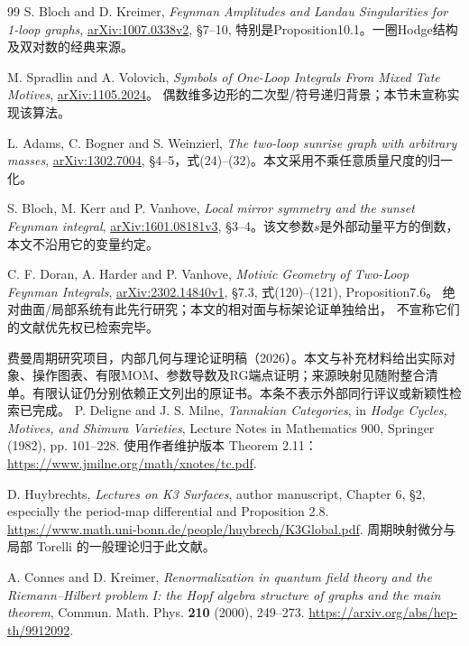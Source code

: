 \documentclass[11pt,a4paper,oneside]{ctexart}
\theoremstyle{cnplain}
\theoremstyle{definition}
\theoremstyle{remark}
\numberwithin{equation}{section}
\begin{document}
\begin{thebibliography}{99}
S. Bloch and D. Kreimer,
\emph{Feynman Amplitudes and Landau Singularities for 1-loop graphs},
\href{https://arxiv.org/abs/1007.0338}{arXiv:1007.0338v2},
\S7--10, 特别是Proposition10.1。一圈Hodge结构及双对数的经典来源。

M. Spradlin and A. Volovich,
\emph{Symbols of One-Loop Integrals From Mixed Tate Motives},
\href{https://arxiv.org/abs/1105.2024}{arXiv:1105.2024}。
偶数维多边形的二次型/符号递归背景；本节未宣称实现该算法。

L. Adams, C. Bogner and S. Weinzierl,
\emph{The two-loop sunrise graph with arbitrary masses},
\href{https://arxiv.org/abs/1302.7004}{arXiv:1302.7004},
\S4--5，式(24)--(32)。本文采用不乘任意质量尺度的归一化。

S. Bloch, M. Kerr and P. Vanhove,
\emph{Local mirror symmetry and the sunset Feynman integral},
\href{https://arxiv.org/abs/1601.08181}{arXiv:1601.08181v3},
\S3--4。该文参数$s$是外部动量平方的倒数，本文不沿用它的变量约定。

C. F. Doran, A. Harder and P. Vanhove,
\emph{Motivic Geometry of Two-Loop Feynman Integrals},
\href{https://arxiv.org/abs/2302.14840}{arXiv:2302.14840v1},
\S7.3, 式(120)--(121), Proposition7.6。
绝对曲面/局部系统有此先行研究；本文的相对面与标架论证单独给出，
不宣称它们的文献优先权已检索完毕。

 费曼周期研究项目，内部几何与理论证明稿（2026）。本文与补充材料给出实际对象、操作图表、有限MOM、参数导数及RG端点证明；来源映射见随附整合清单。有限认证仍分别依赖正文列出的原证书。本条不表示外部同行评议或新颖性检索已完成。
P. Deligne and J. S. Milne,
\emph{Tannakian Categories}, in \emph{Hodge Cycles, Motives, and Shimura Varieties},
Lecture Notes in Mathematics 900, Springer (1982), pp. 101--228.
使用作者维护版本 Theorem 2.11：
\url{https://www.jmilne.org/math/xnotes/tc.pdf}.

D. Huybrechts,
\emph{Lectures on K3 Surfaces}, author manuscript,
Chapter 6, \S2, especially the period-map differential and Proposition 2.8.
\url{https://www.math.uni-bonn.de/people/huybrech/K3Global.pdf}.
周期映射微分与局部 Torelli 的一般理论归于此文献。

A. Connes and D. Kreimer,
\emph{Renormalization in quantum field theory and the Riemann--Hilbert problem I:
the Hopf algebra structure of graphs and the main theorem},
Commun. Math. Phys. \textbf{210} (2000), 249--273.
\url{https://arxiv.org/abs/hep-th/9912092}.

\end{thebibliography}
\end{document}
